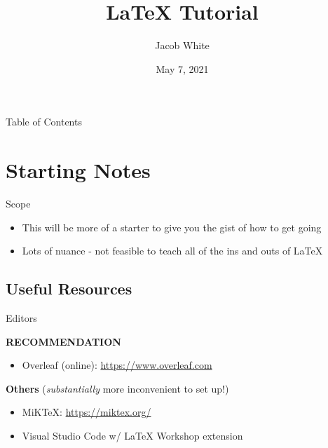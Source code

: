 \documentclass{beamer}
\title{LaTeX Tutorial}
\author{Jacob White}
\institute{Memorial University of Newfoundland}
\date{May 7, 2021}
\begin{document}
\begin{frame}
    \titlepage
\end{frame}

\begin{frame}{Table of Contents}
    \tableofcontents
\end{frame}

\section{Starting Notes}

\begin{frame}{Scope}

    \begin{itemize}
        \item This will be more of a starter to give you the gist of how to get going
        \item Lots of nuance - not feasible to teach all of the ins and outs of \LaTeX
    \end{itemize}
    
\end{frame}

\subsection{Useful Resources}
\begin{frame}{Editors}

    \textbf{RECOMMENDATION}\\
    \begin{itemize}
        \item Overleaf (online): \url{https://www.overleaf.com}
    \end{itemize}
    \vspace{\baselineskip}
    
    \textbf{Others} (\textit{substantially} more inconvenient to set up!)\\
    \begin{itemize}
        \item MiKTeX: \url{https://miktex.org/}
        \item Visual Studio Code w/ LaTeX Workshop extension
    \end{itemize}
    
\end{frame}
\end{document}
